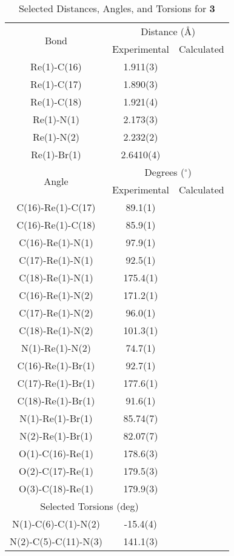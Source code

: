 \begin{table}[htbp]
  \caption{Selected Distances, Angles, and Torsions for \textbf{3}}
  \centering
    \begin{tabular}{ccc}
    \toprule
   \multirow{2}{*}{Bond} & \multicolumn{2}{c}{Distance (\r{A})} \\ \cline{2-3}
     & Experimental & Calculated \\ \midrule
    Re(1)-C(16) & 1.911(3) & \\
    Re(1)-C(17) & 1.890(3) & \\
    Re(1)-C(18) & 1.921(4) & \\
    Re(1)-N(1) & 2.173(3) & \\
    Re(1)-N(2) & 2.232(2) & \\
    Re(1)-Br(1) & 2.6410(4) & \\ \midrule
    \multirow{2}{*}{Angle} & \multicolumn{2}{c}{Degrees ($^\circ$)} \\ \cline{2-3}
     & Experimental & Calculated \\ \midrule
    C(16)-Re(1)-C(17) & 89.1(1) & \\
    C(16)-Re(1)-C(18) & 85.9(1) & \\
    C(16)-Re(1)-N(1) & 97.9(1) & \\
    C(17)-Re(1)-N(1) & 92.5(1) & \\
    C(18)-Re(1)-N(1) & 175.4(1) & \\
    C(16)-Re(1)-N(2) & 171.2(1) & \\
    C(17)-Re(1)-N(2) & 96.0(1) & \\
    C(18)-Re(1)-N(2) & 101.3(1) & \\
    N(1)-Re(1)-N(2) & 74.7(1) & \\
    C(16)-Re(1)-Br(1) & 92.7(1) & \\
    C(17)-Re(1)-Br(1) & 177.6(1) & \\
    C(18)-Re(1)-Br(1) & 91.6(1) & \\
    N(1)-Re(1)-Br(1) & 85.74(7) & \\
    N(2)-Re(1)-Br(1) & 82.07(7) & \\
    O(1)-C(16)-Re(1) & 178.6(3) & \\
    O(2)-C(17)-Re(1) & 179.5(3) & \\
    O(3)-C(18)-Re(1) & 179.9(3) & \\ \midrule
    \multicolumn{2}{c}{Selected Torsions (deg)} \\ \midrule
    N(1)-C(6)-C(1)-N(2) & -15.4(4) & \\
    N(2)-C(5)-C(11)-N(3) & 141.1(3) & \\
    \bottomrule
    \end{tabular}%
  \label{tab.da3}%
\end{table}%


